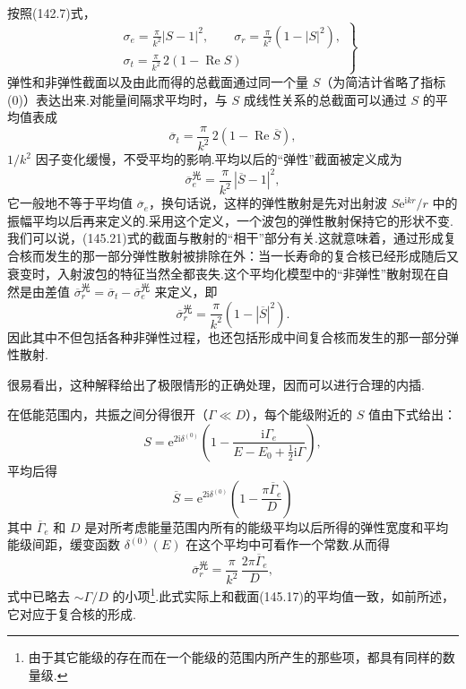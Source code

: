 按照(142.7)式，
\begin{equation}
\left.\begin{aligned}
  &\sigma_e=\frac{\pi}{k^2}|S-1|^2,\qquad
  \sigma_r=\frac{\pi}{k^2}\left(1-|S|^2\right),\\
  &\sigma_t=\frac{\pi}{k^2}\,2\left(1-\operatorname{Re}S\right)
\end{aligned}\right\}
\end{equation}
弹性和非弹性截面以及由此而得的总截面通过同一个量 $S$（为简洁计省略了指标(0)）表达出来.对能量间隔求平均时，与 $S$ 成线性关系的总截面可以通过 $S$ 的平均值表成
\begin{equation}
  \overline{\sigma}_t=\frac{\pi}{k^2}\,2\left(1-\operatorname{Re}\overline{S}\right),
\end{equation}
$1/k^2$ 因子变化缓慢，不受平均的影响.平均以后的“弹性”截面被定义成为
\begin{equation}
  \overline{\sigma}_e^{\text{光}}=\frac{\pi}{k^2}\,|\overline{S}-1|^2,
\end{equation}
它一般地不等于平均值 $\overline{\sigma}_e$，换句话说，这样的弹性散射是先对出射波 $S\mathrm{e}^{\mathrm{i}kr}/r$ 中的振幅平均以后再来定义的.采用这个定义，一个波包的弹性散射保持它的形状不变.我们可以说，(145.21)式的截面与散射的“相干”部分有关.这就意味着，通过形成复合核而发生的那一部分弹性散射被排除在外：当一长寿命的复合核已经形成随后又衰变时，入射波包的特征当然全都丧失.这个平均化模型中的“非弹性”散射现在自然是由差值 $\overline{\sigma}_r^{\text{光}}=\overline{\sigma}_t-\overline{\sigma}_e^{\text{光}}$ 来定义，即
\begin{equation}
  \overline{\sigma}_r^{\text{光}}=\frac{\pi}{k^2}\left(1-|\overline{S}|^2\right).
\end{equation}
因此其中不但包括各种非弹性过程，也还包括形成中间复合核而发生的那一部分弹性散射.

很易看出，这种解释给出了极限情形的正确处理，因而可以进行合理的内插.

在低能范围内，共振之间分得很开（$\Gamma\ll D$），每个能级附近的 $S$ 值由下式给出：
\begin{equation*}
  S=\mathrm{e}^{2\mathrm{i}\delta^{(0)}}
  \left(1-\frac{\mathrm{i}\Gamma_e}{E-E_0+\frac{1}{2}\mathrm{i}\Gamma}\right),
\end{equation*}
平均后得
\begin{equation}
  \overline{S}=\mathrm{e}^{2\mathrm{i}\delta^{(0)}}
  \left(1-\frac{\pi\overline{\Gamma}_e}{D}\right)
\end{equation}
其中 $\overline{\Gamma}_e$ 和 $D$ 是对所考虑能量范围内所有的能级平均以后所得的弹性宽度和平均能级间距，缓变函数 $\delta^{(0)}(E)$ 在这个平均中可看作一个常数.从而得
\begin{equation}
  \overline{\sigma}_r^{\text{光}}=\frac{\pi}{k^2}\,\frac{2\pi\overline{\Gamma}_e}{D},
\end{equation}
式中已略去 $\sim\Gamma/D$ 的小项\footnote{由于其它能级的存在而在一个能级的范围内所产生的那些项，都具有同样的数量级.}.此式实际上和截面(145.17)的平均值一致，如前所述，它对应于复合核的形成.

